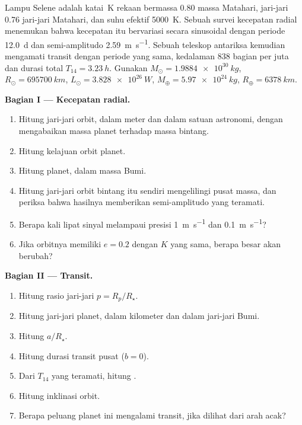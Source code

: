 \begin{problem}
\label{pb:b3:exoplanets:1}
Lampu Selene adalah katai~K rekaan bermassa 0.80 massa Matahari, jari-jari
0.76 jari-jari Matahari, dan suhu efektif \qty{5000}{K}. Sebuah survei
kecepatan radial menemukan bahwa kecepatan itu bervariasi secara sinusoidal
dengan periode \qty{12.0}{d} dan semi-amplitudo \qty{2.59}{m.s^{-1}}. Sebuah
teleskop antariksa kemudian mengamati transit dengan periode yang sama,
kedalaman \num{838} bagian per juta dan durasi total $T_{14} = \qty{3.23}{h}$.
Gunakan $M_\odot = \qty{1.9884e30}{kg}$, $R_\odot = \qty{695700}{km}$,
$L_\odot = \qty{3.828e26}{W}$, $M_\oplus = \qty{5.97e24}{kg}$,
$R_\oplus = \qty{6378}{km}$.

\medskip\noindent\textbf{Bagian I --- Kecepatan radial.}
\begin{enumerate}
\item Hitung jari-jari orbit, dalam meter dan dalam
  satuan astronomi, dengan mengabaikan massa planet terhadap massa bintang.
\item Hitung kelajuan orbit planet.
\item Hitung  planet, dalam massa Bumi.
\item Hitung jari-jari orbit bintang itu sendiri mengelilingi pusat
  massa, dan periksa bahwa hasilnya memberikan semi-amplitudo yang teramati.
\item Berapa kali lipat sinyal melampaui presisi
  \qty{1}{m.s^{-1}} dan \qty{0.1}{m.s^{-1}}?
\item Jika orbitnya memiliki $e = 0.2$ dengan $K$ yang sama, berapa besar
   akan berubah?
\end{enumerate}

\medskip\noindent\textbf{Bagian II --- Transit.}
\begin{enumerate}[resume]
\item Hitung rasio jari-jari $p = R_p/R_\star$.
\item Hitung jari-jari planet, dalam kilometer dan dalam jari-jari Bumi.
\item Hitung $a/R_\star$.
\item Hitung durasi transit pusat ($b = 0$).
\item Dari $T_{14}$ yang teramati, hitung .
\item Hitung inklinasi orbit.
\item Berapa peluang planet ini mengalami transit, jika dilihat dari arah
  acak?
\end{enumerate}


\end{problem}
